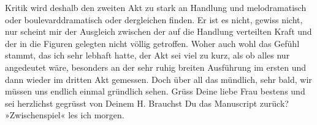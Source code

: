 \begin{ledgroupsized}[t]{13cm}
               Kritik wird deshalb den zweiten Akt zu stark an Handlung und melodramatisch oder
               boulevarddramatisch oder dergleichen finden. Er ist es nicht, gewiss nicht, nur
               scheint mir der Ausgleich zwischen der auf die Handlung verteilten Kraft und der in
               die Figuren gelegten nicht völlig getroffen. Woher auch wohl das Gefühl stammt, das
               ich sehr lebhaft hatte, der Akt sei viel zu kurz, als ob alles nur angedeutet wäre,
               besonders an der sehr ruhig breiten Ausführung im ersten und dann wieder im dritten
               Akt gemessen. Doch über all das mündlich, sehr bald, wir müssen uns endlich einmal
               gründlich sehen. Grüss Deine liebe Frau bestens und sei herzlichst gegrüsst von Deinem\pend
           \pstart \spacefill\mbox{H.}\pend{}\pstart
           \noindent{}Brauchst Du das Manuscript zurück? »Zwischenspiel« les ich morgen.\pend
           \endnumbering{}\end{ledgroupsized}  \newcommand{\dateiname}{L01548}\newcommand{\titel}{Hermann Bahr an Arthur Schnitzler, 17. 9. 1905}\newcommand{\editorInnen}{ Kurt Ifkovits,  Martin Anton Müller}
      